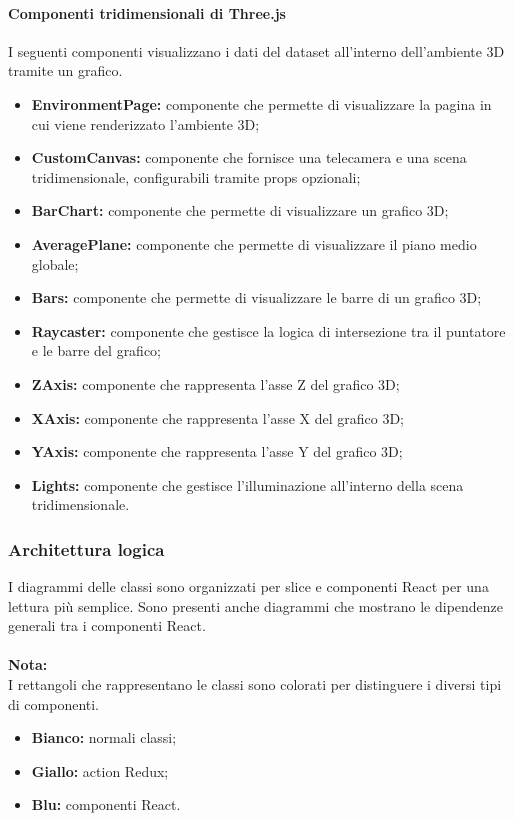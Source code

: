 \paragraph{Componenti tridimensionali di Three.js}
I seguenti componenti visualizzano i dati del dataset all'interno dell'ambiente
3D tramite un grafico.
\begin{itemize}
      \item \textbf{EnvironmentPage:} componente che permette di visualizzare la pagina in cui viene renderizzato l'ambiente 3D;
      \item \textbf{CustomCanvas:} componente che fornisce una telecamera e una scena tridimensionale, configurabili tramite props opzionali;
      \item \textbf{BarChart:} componente che permette di visualizzare un grafico 3D;
      \item \textbf{AveragePlane:} componente che permette di visualizzare il piano medio globale;
      \item \textbf{Bars:} componente che permette di visualizzare le barre di un grafico 3D;
      \item \textbf{Raycaster:} componente che gestisce la logica di intersezione tra il puntatore e le barre del grafico;
      \item \textbf{ZAxis:} componente che rappresenta l'asse Z del grafico 3D;
      \item \textbf{XAxis:} componente che rappresenta l'asse X del grafico 3D;
      \item \textbf{YAxis:} componente che rappresenta l'asse Y del grafico 3D;
      \item \textbf{Lights:} componente che gestisce l'illuminazione all'interno della scena tridimensionale.
\end{itemize}

\pagebreak

\subsubsection{Architettura logica}
I diagrammi delle classi sono organizzati per slice e componenti React per una
lettura più semplice. Sono presenti anche diagrammi che mostrano le dipendenze
generali tra i componenti React.\\\\ \textbf{Nota:}\\ I rettangoli che
rappresentano le classi sono colorati per distinguere i diversi tipi di
componenti.
\begin{itemize}
      \item \textbf{Bianco:} normali classi;
      \item \textbf{Giallo:} action Redux;
      \item \textbf{Blu:} componenti React.
\end{itemize}

